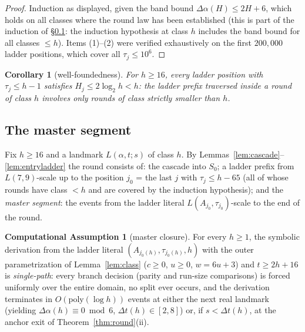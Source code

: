 \documentclass[11pt]{amsart}
\newtheorem{corollary}[theorem]{Corollary}
\theoremstyle{definition}
\newtheorem{assumption}[theorem]{Computational Assumption}
\begin{document}
\begin{proof}
Induction as displayed, given the band bound
$\Delta\alpha(H)\le 2H+6$, which holds on all classes where the round law
has been established (this is part of the induction of \S\ref{s:master}:
the induction hypothesis at class $h$ includes the band bound for all
classes $\le h$). Items (1)--(2) were verified exhaustively on the first
$200{,}000$ ladder positions, which cover all $\tau_j\le10^{6}$.
\end{proof}

\begin{corollary}[well-foundedness]\label{cor:wellfounded}
For $h\ge16$, every ladder position with $\tau_j\le h-1$ satisfies
$H_j\le 2\log_2 h<h$: the ladder prefix traversed inside a round of class
$h$ involves only rounds of class strictly smaller than $h$.
\end{corollary}

\subsection{The master segment}\label{s:master}

Fix $h\ge16$ and a landmark $L(\alpha,t;s)$ of class $h$. By
Lemmas~\ref{lem:cascade}--\ref{lem:entryladder} the round consists of: the
cascade into $S_0$; a ladder prefix from $L(7,9)$-scale up to the position
$j_0$ = the last $j$ with $\tau_j\le h-65$ (all of whose rounds have class
$<h$ and are covered by the induction hypothesis); and the \emph{master
segment}: the events from the ladder literal
$L(A_{j_0},\tau_{j_0})$-scale to the end of the round.

\begin{assumption}[master closure]\label{ass:master}
For every $h\ge1$, the symbolic derivation from the ladder literal
$(A_{j_0(h)},\tau_{j_0(h)},h)$ with the outer parametrization of
Lemma~\ref{lem:class} ($c\ge0$, $u\ge0$, $w=6u+3$) and $t\ge2h+16$ is
\emph{single-path}: every branch decision (parity and run-size comparisons)
is forced uniformly over the entire domain, no split ever occurs, and the
derivation terminates in $O(\mathrm{poly}(\log h))$ events at either the
next real landmark (yielding $\Delta\alpha(h)\equiv0\bmod6$,
$\Delta t(h)\in[2,8]$) or, if $s<\Delta t(h)$, at the anchor exit of
Theorem~\ref{thm:round}(ii). 
\end{assumption}
\end{document}

